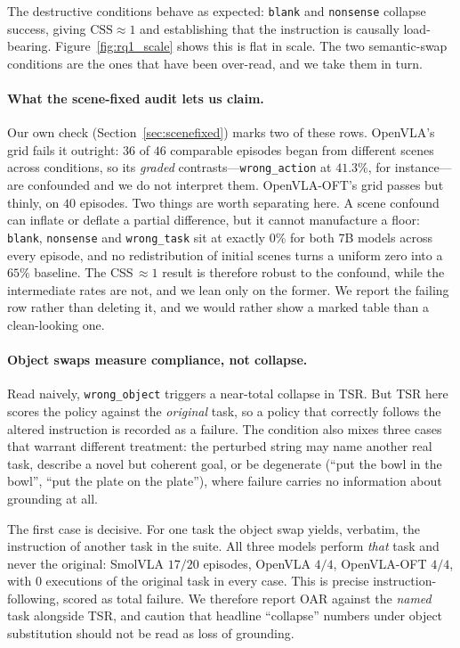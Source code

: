 \documentclass[11pt]{article}
\begin{document}
The destructive conditions behave as expected: \texttt{blank} and \texttt{nonsense}
collapse success, giving $\text{CSS}\approx 1$ and establishing that the instruction
is causally load-bearing. Figure~\ref{fig:rq1_scale} shows this is flat in scale.
The two semantic-swap conditions are the ones that have been over-read, and we take
them in turn.

\paragraph{What the scene-fixed audit lets us claim.} Our own check (Section~\ref{sec:scenefixed})
marks two of these rows. OpenVLA's grid fails it outright: $36$ of $46$ comparable
episodes began from different scenes across conditions, so its \emph{graded}
contrasts---\texttt{wrong\_action} at $41.3\%$, for instance---are confounded and we
do not interpret them. OpenVLA-OFT's grid passes but thinly, on $40$ episodes.
Two things are worth separating here. A scene confound can inflate or deflate a
partial difference, but it cannot manufacture a floor: \texttt{blank},
\texttt{nonsense} and \texttt{wrong\_task} sit at exactly $0\%$ for both 7B models
across every episode, and no redistribution of initial scenes turns a uniform zero
into a $65\%$ baseline. The CSS$\,\approx\!1$ result is therefore robust to the
confound, while the intermediate rates are not, and we lean only on the former. We
report the failing row rather than deleting it, and we would rather show a marked
table than a clean-looking one.

\paragraph{Object swaps measure compliance, not collapse.}
Read naively, \texttt{wrong\_object} triggers a near-total collapse in TSR. But
TSR here scores the policy against the \emph{original} task, so a policy that
correctly follows the altered instruction is recorded as a failure. The condition
also mixes three cases that warrant different treatment: the perturbed string may
name another real task, describe a novel but coherent goal, or be degenerate
(``put the bowl in the bowl'', ``put the plate on the plate''), where failure
carries no information about grounding at all.

The first case is decisive. For one task the object swap yields, verbatim, the
instruction of another task in the suite. All three models perform \emph{that}
task and never the original: SmolVLA $17/20$ episodes, OpenVLA $4/4$, OpenVLA-OFT
$4/4$, with $0$ executions of the original task in every case. This is precise
instruction-following, scored as total failure. We therefore report OAR against
the \emph{named} task alongside TSR, and caution that headline ``collapse''
numbers under object substitution should not be read as loss of grounding.
\end{document}
